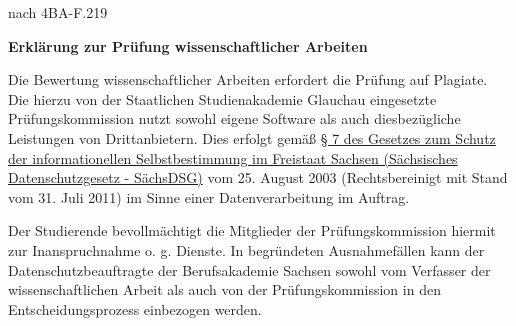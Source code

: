   \rohead{}
      \vspace*{2mm}

      \begin{minipage}{0.5\columnwidth}
          
      \end{minipage}
      \begin{minipage}{0.45\columnwidth}
          \begin{flushright}
              {\small nach 4BA-F.219\\}
          \end{flushright}
      \end{minipage}
      \vspace*{2mm}

      \begin{center}
          \textbf{\huge{Erklärung zur Prüfung wissenschaftlicher Arbeiten}}
      \end{center}

      Die Bewertung wissenschaftlicher Arbeiten erfordert die Prüfung auf Plagiate. Die hierzu von der Staatlichen Studienakademie Glauchau eingesetzte Prüfungskommission nutzt sowohl eigene Software als auch diesbezügliche Leistungen von Drittanbietern. Dies erfolgt gemäß \href{https://www.revosax.sachsen.de/vorschrift/1672-Saechsisches-Datenschutzgesetz#p7}{§ 7 des Gesetzes zum Schutz der informationellen Selbstbestimmung im Freistaat Sachsen (Sächsisches Datenschutzgesetz - SächsDSG)} vom 25. August 2003 (Rechtsbereinigt mit Stand vom 31. Juli 2011) im Sinne einer Datenverarbeitung im Auftrag.

      Der Studierende bevollmächtigt die Mitglieder der Prüfungskommission hiermit zur Inanspruchnahme o. g. Dienste. In begründeten Ausnahmefällen kann der Datenschutzbeauftragte der Berufsakademie Sachsen sowohl vom Verfasser der wissenschaftlichen Arbeit als auch von der Prüfungskommission in den Entscheidungsprozess einbezogen werden.


